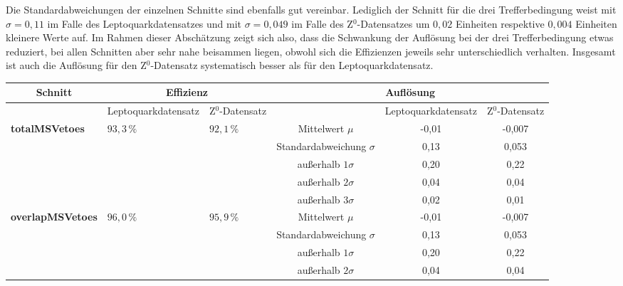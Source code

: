 Die Standardabweichungen der einzelnen Schnitte sind ebenfalls gut vereinbar. Lediglich der Schnitt für die drei Trefferbedingung weist mit $\sigma=0,11$ im Falle des Leptoquarkdatensatzes und mit $\sigma=0,049$ im Falle des Z$^0$-Datensatzes um $0,02$ Einheiten respektive $0,004$ Einheiten kleinere Werte auf. Im Rahmen dieser Abschätzung zeigt sich also, dass die Schwankung der Auflösung bei der drei Trefferbedingung etwas reduziert, bei allen Schnitten aber sehr nahe beisammen liegen, obwohl sich die Effizienzen jeweils sehr unterschiedlich verhalten. Insgesamt ist auch die Auflösung für den Z$^0$-Datensatz systematisch besser als für den Leptoquarkdatensatz.  
\begin{sidewaystable}[htbp]
\footnotesize
\begin{tabular}{c|c|c|c|c|c}
\hline
\hline
\textbf{Schnitt}  & \multicolumn{ 2}{c|}{\textbf{Effizienz} } & \multicolumn{ 3}{c}{\textbf{Auflösung}} \\ \hline
 & Leptoquarkdatensatz & Z$^0$-Datensatz &  & \multicolumn{1}{c|}{Leptoquarkdatensatz} & \multicolumn{1}{c}{Z$^0$-Datensatz} \\ \hline
\multicolumn{ 1}{l|}{\textbf{totalMSVetoes}} & \multicolumn{ 1}{l|}{$93,3\,\%$} & \multicolumn{ 1}{l|}{$92,1\,\%$} & Mittelwert $\mu$ & -0,01 & -0,007 \\ \cline{ 4- 6}
\multicolumn{ 1}{l|}{} & \multicolumn{ 1}{l|}{} & \multicolumn{ 1}{l|}{} & Standardabweichung $\sigma$ & 0,13 & 0,053 \\ \cline{ 4- 6}
\multicolumn{ 1}{l|}{} & \multicolumn{ 1}{l|}{} & \multicolumn{ 1}{l|}{} & außerhalb $1\sigma$ & 0,20 & 0,22 \\ \cline{ 4- 6}
\multicolumn{ 1}{l|}{} & \multicolumn{ 1}{l|}{} & \multicolumn{ 1}{l|}{} & außerhalb $2\sigma$ & 0,04 & 0,04 \\ \cline{ 4- 6}
\multicolumn{ 1}{l|}{} & \multicolumn{ 1}{l|}{} & \multicolumn{ 1}{l|}{} & außerhalb $3\sigma$ & 0,02 & 0,01 \\ \hline
\multicolumn{ 1}{l|}{\textbf{overlapMSVetoes}} & \multicolumn{ 1}{l|}{$96,0\,\%$} & \multicolumn{ 1}{l|}{$95,9\,\%$} & Mittelwert $\mu$ & -0,01 & -0,007 \\ \cline{ 4- 6}
\multicolumn{ 1}{l|}{} & \multicolumn{ 1}{l|}{} & \multicolumn{ 1}{l|}{} & Standardabweichung $\sigma$ & 0,13 & 0,053 \\ \cline{ 4- 6}
\multicolumn{ 1}{l|}{} & \multicolumn{ 1}{l|}{} & \multicolumn{ 1}{l|}{} & außerhalb $1\sigma$ & 0,20 & 0,22 \\ \cline{ 4- 6}
\multicolumn{ 1}{l|}{} & \multicolumn{ 1}{l|}{} & \multicolumn{ 1}{l|}{} & außerhalb $2\sigma$ & 0,04 & 0,04 \\ \cline{ 4- 6}

\end{tabular}
\end{sidewaystable}
